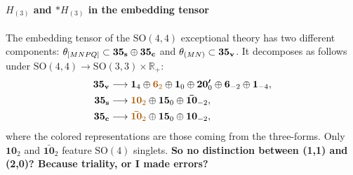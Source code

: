 \documentclass[11pt]{article}
\newcommand{\SO}{\ensuremath{\mathrm{SO}}\xspace}
\newcommand{\R}{\ensuremath{\mathbb{R}}\xspace}
\newcommand{\ce}[1]{\marginpar{\parbox{\marginparwidth}{\boldmath $\Longleftarrow$}}
{\boldmath\bfseries #1}}
\begin{document}
\paragraph{\boldmath $H_{(3)}$ and $*H_{(3)}$ in the embedding tensor} The embedding tensor of the $\SO(4,4)$ exceptional theory has two different components: $\theta_{[MNPQ]}\subset\bm{35_{\rm s}}\oplus\bm{35_{\rm c}}$ and $\theta_{(MN)}\subset\bm{35_{\rm v}}$. It decomposes as follows under $\SO(4,4)\rightarrow\SO(3,3)\times\R_{+}$:
\begin{equation}
  \begin{aligned}
    \bm{35_{\rm v}} &\longrightarrow \bm{1}_{4} \oplus {\color{mydarkorange}\bm{6}_{2}} \oplus \bm{1}_{0} \oplus \bm{20'}_{0} \oplus \bm{6}_{-2} \oplus \bm{1}_{-4},\\
    \bm{35_{\rm s}} &\longrightarrow {\color{mydarkorange}\bm{10}_{2}} \oplus \bm{15}_{0}  \oplus \bm{\bar{10}}_{-2},\\
    \bm{35_{\rm c}} &\longrightarrow {\color{mydarkorange}\bm{\bar{10}}_{2}} \oplus \bm{15}_{0}  \oplus \bm{10}_{-2},
  \end{aligned}
\end{equation}
where the colored representations are those coming from the three-forms. Only $\bm{10}_{2}$ and $\bm{\bar{10}}_{2}$ feature $\SO(4)$ singlets. \ce{So no distinction between (1,1) and (2,0)? Because triality, or I made errors?}


\end{document}
